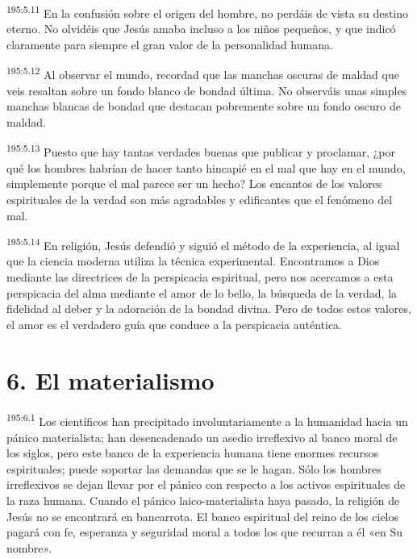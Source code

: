\par
\textsuperscript{195:5.11} En la confusión sobre el origen del hombre, no perdáis de vista su destino eterno. No olvidéis que Jesús amaba incluso a los niños pequeños, y que indicó claramente para siempre el gran valor de la personalidad humana.

\par
\textsuperscript{195:5.12} Al observar el mundo, recordad que las manchas oscuras de maldad que veis resaltan sobre un fondo blanco de bondad última. No observáis unas simples manchas blancas de bondad que destacan pobremente sobre un fondo oscuro de maldad.

\par
\textsuperscript{195:5.13} Puesto que hay tantas verdades buenas que publicar y proclamar, ¿por qué los hombres habrían de hacer tanto hincapié en el mal que hay en el mundo, simplemente porque el mal parece ser un hecho? Los encantos de los valores espirituales de la verdad son más agradables y edificantes que el fenómeno del mal.

\par
\textsuperscript{195:5.14} En religión, Jesús defendió y siguió el método de la experiencia, al igual que la ciencia moderna utiliza la técnica experimental. Encontramos a Dios mediante las directrices de la perspicacia espiritual, pero nos acercamos a esta perspicacia del alma mediante el amor de lo bello, la búsqueda de la verdad, la fidelidad al deber y la adoración de la bondad divina. Pero de todos estos valores, el amor es el verdadero guía que conduce a la perspicacia auténtica.

\section*{6. El materialismo}
\par
\textsuperscript{195:6.1} Los científicos han precipitado involuntariamente a la humanidad hacia un pánico materialista; han desencadenado un asedio irreflexivo al banco moral de los siglos, pero este banco de la experiencia humana tiene enormes recursos espirituales; puede soportar las demandas que se le hagan. Sólo los hombres irreflexivos se dejan llevar por el pánico con respecto a los activos espirituales de la raza humana. Cuando el pánico laico-materialista haya pasado, la religión de Jesús no se encontrará en bancarrota. El banco espiritual del reino de los cielos pagará con fe, esperanza y seguridad moral a todos los que recurran a él «en Su nombre».

